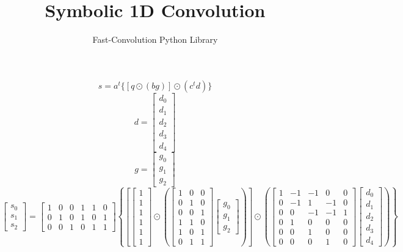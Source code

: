 \documentclass{article}%
\title{Symbolic 1D Convolution}%
\author{Fast{-}Convolution Python Library}%
\begin{document}
%
\normalsize%
\maketitle%
\[%
s = a^t \{[q \odot (bg)] \odot (c^t d)\}%
\]%
\[%
d = \left[\begin{matrix}d_{0}\\d_{1}\\d_{2}\\d_{3}\\d_{4}\end{matrix}\right]%
\]%
\[%
g = \left[\begin{matrix}g_{0}\\g_{1}\\g_{2}\end{matrix}\right]%
\]%
\[%
\left[\begin{matrix}s_{0}\\s_{1}\\s_{2}\end{matrix}\right] = \left[\begin{matrix}1 & 0 & 0 & 1 & 1 & 0\\0 & 1 & 0 & 1 & 0 & 1\\0 & 0 & 1 & 0 & 1 & 1\end{matrix}\right] \left\{ \left[ \left[\begin{matrix}1\\1\\1\\1\\1\\1\end{matrix}\right] \odot \left( \left[\begin{matrix}1 & 0 & 0\\0 & 1 & 0\\0 & 0 & 1\\1 & 1 & 0\\1 & 0 & 1\\0 & 1 & 1\end{matrix}\right] \left[\begin{matrix}g_{0}\\g_{1}\\g_{2}\end{matrix}\right] \right) \right] \odot \left( \left[\begin{matrix}1 & -1 & -1 & 0 & 0\\0 & -1 & 1 & -1 & 0\\0 & 0 & -1 & -1 & 1\\0 & 1 & 0 & 0 & 0\\0 & 0 & 1 & 0 & 0\\0 & 0 & 0 & 1 & 0\end{matrix}\right] \left[\begin{matrix}d_{0}\\d_{1}\\d_{2}\\d_{3}\\d_{4}\end{matrix}\right] \right) \right\}%
\]%
\end{document}

